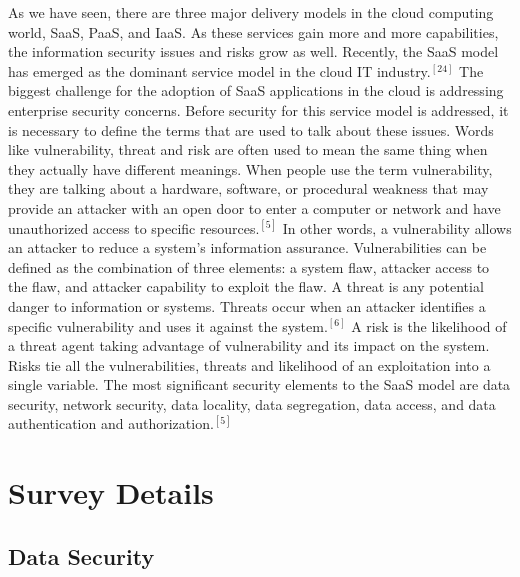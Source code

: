 \documentclass[a4paper, 8pt]{article} %
\begin{document}
\begin{doublespacing}

As we have seen, there are three major delivery models in the cloud computing world, SaaS, PaaS, and IaaS.  As these services gain more and more capabilities, the information security issues and risks grow as well.  Recently, the SaaS model has emerged as the dominant service model in the cloud IT industry.$^{[24]}$  The biggest challenge for the adoption of SaaS applications in the cloud is addressing enterprise security concerns.  Before security for this service model is addressed, it is necessary to define the terms that are used to talk about these issues.  Words like vulnerability, threat and risk are often used to mean the same thing when they actually have different meanings.  When people use the term vulnerability, they are talking about a hardware, software, or procedural weakness that may provide an attacker with an open door to enter a computer or network and have unauthorized access to specific resources.$^{[5]}$  In other words, a vulnerability allows an attacker to reduce a system's information assurance.  Vulnerabilities can be defined as the combination of three elements: a system flaw, attacker access to the flaw, and attacker capability to exploit the flaw.  A threat is any potential danger to information or systems.  Threats occur when an attacker identifies a specific vulnerability and uses it against the system.$^{[6]}$  A risk is the likelihood of a threat agent taking advantage of vulnerability and its impact on the system.  Risks tie all the vulnerabilities, threats and likelihood of an exploitation into a single variable.  The most significant security elements to the SaaS model are data security, network security, data locality, data segregation, data access, and data authentication and authorization.$^{[5]}$  

\section*{Survey Details}

\subsection*{Data Security}


\end{doublespacing}
\end{document}
